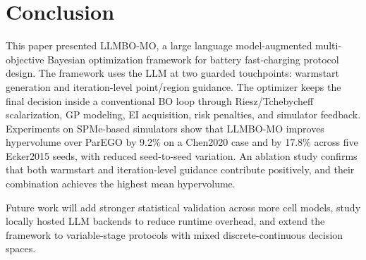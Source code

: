 \section{Conclusion}
\label{sec:conclusion}

This paper presented LLMBO-MO, a large language model-augmented
multi-objective Bayesian optimization framework for battery fast-charging
protocol design. The framework uses the LLM at two guarded touchpoints:
warmstart generation and iteration-level point/region guidance. The optimizer
keeps the final decision inside a conventional BO loop through Riesz/Tchebycheff
scalarization, GP modeling, EI acquisition, risk penalties, and simulator
feedback. Experiments on SPMe-based simulators show that LLMBO-MO improves
hypervolume over ParEGO by 9.2\% on a Chen2020 case and by 17.8\% across
five Ecker2015 seeds, with reduced seed-to-seed variation. An ablation
study confirms that both warmstart and iteration-level guidance contribute
positively, and their combination achieves the highest mean hypervolume.

Future work will add stronger statistical validation across more cell models,
study locally hosted LLM backends to reduce runtime overhead, and extend the
framework to variable-stage protocols with mixed discrete-continuous decision
spaces.
